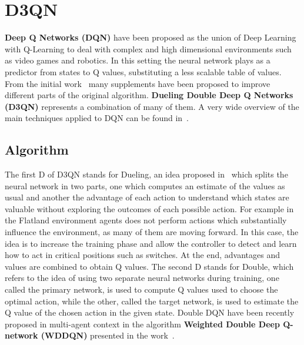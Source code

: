 \documentclass[11pt, a4paper, hidelinks]{report}
\begin{document}
\section{D3QN}\label{sec:d3qn}

\textbf{Deep Q Networks (DQN)} have been proposed as the union of Deep Learning with Q-Learning to deal with complex and high dimensional environments such as video games and robotics.
In this setting the neural network plays as a predictor from states to Q values, substituting a less scalable table of values.
From the initial work~\citep{dqn} many supplements have been proposed to improve different parts of the original algorithm.
\textbf{Dueling Double Deep Q Networks (D3QN)} represents a combination of many of them.
A very wide overview of the main techniques applied to DQN can be found in~\citep{rainbow}.

\subsection{Algorithm}\label{subsec:algorithm2}

The first D of D3QN stands for Dueling, an idea proposed in~\citep{dueling} which splits the neural network in two parts, one which computes an estimate of the values as usual and another the advantage of each action to understand which states are valuable without exploring the outcomes of each possible action.
For example in the Flatland environment agents does not perform actions which substantially influence the environment, as many of them are moving forward.
In this case, the idea is to increase the training phase and allow the controller to detect and learn how to act in critical positions such as switches.
At the end, advantages and values are combined to obtain Q values.
The second D stands for Double, which refers to the idea of using two separate neural networks during training, one called the primary network, is used to compute Q values used to choose the optimal action, while the other, called the target network, is used to estimate the Q value of the chosen action in the given state.
Double DQN have been recently proposed in multi-agent context in the algorithm \textbf{Weighted Double Deep Q-network (WDDQN)} presented in the work~\citep{weighted-ddqn}.
\end{document}
